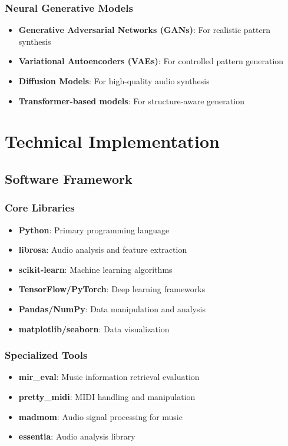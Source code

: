 \documentclass[12pt]{article}
\begin{document}
\subsubsection{Neural Generative Models}
\begin{itemize}
    \item \textbf{Generative Adversarial Networks (GANs)}: For realistic pattern synthesis
    \item \textbf{Variational Autoencoders (VAEs)}: For controlled pattern generation
    \item \textbf{Diffusion Models}: For high-quality audio synthesis
    \item \textbf{Transformer-based models}: For structure-aware generation
\end{itemize}

\section{Technical Implementation}

\subsection{Software Framework}

\subsubsection{Core Libraries}
\begin{itemize}
    \item \textbf{Python}: Primary programming language
    \item \textbf{librosa}: Audio analysis and feature extraction
    \item \textbf{scikit-learn}: Machine learning algorithms
    \item \textbf{TensorFlow/PyTorch}: Deep learning frameworks
    \item \textbf{Pandas/NumPy}: Data manipulation and analysis
    \item \textbf{matplotlib/seaborn}: Data visualization
\end{itemize}

\subsubsection{Specialized Tools}
\begin{itemize}
    \item \textbf{mir\_eval}: Music information retrieval evaluation
    \item \textbf{pretty\_midi}: MIDI handling and manipulation
    \item \textbf{madmom}: Audio signal processing for music
    \item \textbf{essentia}: Audio analysis library
\end{itemize}
\end{document}
